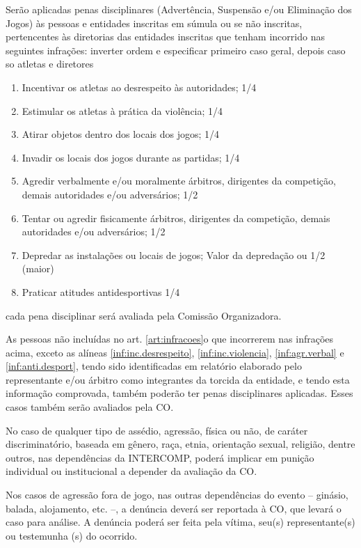 \begin{article}
	\label{art:infracoes}
	Serão aplicadas penas disciplinares (Advertência, Suspensão e/ou Eliminação dos Jogos) às pessoas e entidades inscritas em súmula ou se não inscritas, pertencentes às diretorias das entidades inscritas que tenham incorrido nas seguintes infrações:
	inverter ordem e especificar primeiro caso geral, depois caso so atletas e diretores
	
	
	\begin{enumerate}[noitemsep]
		\item \label{inf:inc.desrespeito}
			Incentivar os atletas ao desrespeito às autoridades; 1/4
		\item \label{inf:inc.violencia}
			Estimular os atletas à prática da violência; 1/4
		\item Atirar objetos dentro dos locais dos jogos; 1/4
		\item Invadir os locais dos jogos durante as partidas; 1/4
		\item \label{inf:agr.verbal}
			Agredir verbalmente e/ou moralmente árbitros, dirigentes da competição, demais autoridades e/ou adversários; 1/2
		\item Tentar ou agredir fisicamente árbitros, dirigentes da competição, demais autoridades e/ou adversários; 1/2
		\item Depredar as instalações ou locais de jogos; Valor da depredação ou 1/2 (maior)
		\item \label{inf:anti.desport}
			Praticar atitudes antidesportivas 1/4
	\end{enumerate}

	\begin{xparagraph}
		cada pena disciplinar será avaliada pela Comissão Organizadora.
	\end{xparagraph}
\end{article}

\begin{article}
	As pessoas não incluídas no art. \ref{art:infracoes}o que incorrerem nas infrações acima, exceto as alíneas \ref{inf:inc.desrespeito}, \ref{inf:inc.violencia}, \ref{inf:agr.verbal} e \ref{inf:anti.desport}, tendo sido identificadas em relatório elaborado pelo representante e/ou árbitro como integrantes da torcida da entidade, e tendo esta informação comprovada, também poderão ter penas disciplinares aplicadas. Esses casos também serão avaliados pela CO.
\end{article}

\begin{article}
	No caso de qualquer tipo de assédio, agressão, física ou não, de caráter discriminatório, baseada em gênero, raça, etnia, orientação sexual, religião, dentre outros, nas dependências da INTERCOMP, poderá implicar em punição individual ou institucional a depender da avaliação da CO.

	\begin{xparagraph}
		Nos casos de agressão fora de jogo, nas outras dependências do evento -- ginásio, balada, alojamento, etc. --, a denúncia deverá ser reportada à CO, que levará o caso para análise. A denúncia poderá ser feita pela vítima, seu(s) representante(s) ou testemunha (s) do ocorrido.
	\end{xparagraph}
\end{article}
